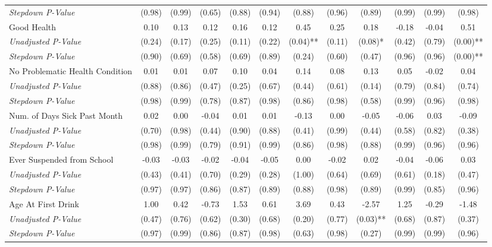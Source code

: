 \begin{tabular}{l c c c c c c c c c c c}
\quad \textit{Stepdown P-Value} & (0.98) & (0.99) & (0.65) & (0.88) & (0.94) & (0.88) & (0.96) & (0.89) & (0.99) & (0.99) & (0.98) \\
Good Health & 0.10 & 0.13 & 0.12 & 0.16 & 0.12 & 0.45 & 0.25 & 0.18 & -0.18 & -0.04 & 0.51 \\
\quad \textit{Unadjusted P-Value} & (0.24) & (0.17) & (0.25) & (0.11) & (0.22) & (0.04)** & (0.11) & (0.08)* & (0.42) & (0.79) & (0.00)** \\
\quad \textit{Stepdown P-Value} & (0.90) & (0.69) & (0.58) & (0.69) & (0.89) & (0.24) & (0.60) & (0.47) & (0.96) & (0.96) & (0.00)** \\
No Problematic Health Condition & 0.01 & 0.01 & 0.07 & 0.10 & 0.04 & 0.14 & 0.08 & 0.13 & 0.05 & -0.02 & 0.04 \\
\quad \textit{Unadjusted P-Value} & (0.88) & (0.86) & (0.47) & (0.25) & (0.67) & (0.44) & (0.61) & (0.14) & (0.79) & (0.84) & (0.74) \\
\quad \textit{Stepdown P-Value} & (0.98) & (0.99) & (0.78) & (0.87) & (0.98) & (0.86) & (0.98) & (0.58) & (0.99) & (0.96) & (0.98) \\
Num. of Days Sick Past Month & 0.02 & 0.00 & -0.04 & 0.01 & 0.01 & -0.13 & 0.00 & -0.05 & -0.06 & 0.03 & -0.09 \\
\quad \textit{Unadjusted P-Value} & (0.70) & (0.98) & (0.44) & (0.90) & (0.88) & (0.41) & (0.99) & (0.44) & (0.58) & (0.82) & (0.38) \\
\quad \textit{Stepdown P-Value} & (0.98) & (0.99) & (0.79) & (0.91) & (0.99) & (0.86) & (0.98) & (0.88) & (0.99) & (0.96) & (0.96) \\
Ever Suspended from School & -0.03 & -0.03 & -0.02 & -0.04 & -0.05 & 0.00 & -0.02 & 0.02 & -0.04 & -0.06 & 0.03 \\
\quad \textit{Unadjusted P-Value} & (0.43) & (0.41) & (0.70) & (0.29) & (0.28) & (1.00) & (0.64) & (0.69) & (0.61) & (0.18) & (0.47) \\
\quad \textit{Stepdown P-Value} & (0.97) & (0.97) & (0.86) & (0.87) & (0.89) & (0.88) & (0.98) & (0.89) & (0.99) & (0.85) & (0.96) \\
Age At First Drink & 1.00 & 0.42 & -0.73 & 1.53 & 0.61 & 3.69 & 0.43 & -2.57 & 1.25 & -0.29 & -1.48 \\
\quad \textit{Unadjusted P-Value} & (0.47) & (0.76) & (0.62) & (0.30) & (0.68) & (0.20) & (0.77) & (0.03)** & (0.68) & (0.87) & (0.37) \\
\quad \textit{Stepdown P-Value} & (0.97) & (0.99) & (0.86) & (0.87) & (0.98) & (0.63) & (0.98) & (0.27) & (0.99) & (0.99) & (0.96) \\
\bottomrule
\end{tabular}

